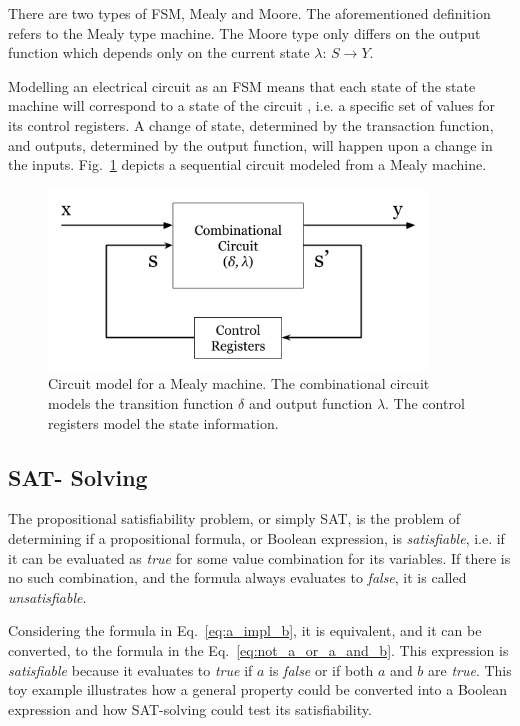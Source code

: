 There are two types of FSM, Mealy and Moore. The aforementioned definition refers to the Mealy type machine. The Moore type only differs on the output function which depends only on the current state $\lambda$: $S \to Y$.

Modelling an electrical circuit as an FSM means that each state of the state machine will correspond to a state of the circuit  , i.e. a specific set of values for its control registers. A change of state, determined by the transaction function, and outputs, determined by the output function, will happen upon a change in the inputs. Fig.~\ref{fig:mealy_circuit} depicts a sequential circuit modeled from a Mealy machine.

\begin{figure}[htb!]
	\centering
	\includegraphics[width=10cm]{images/mealy_circuit.png}
	\caption{Circuit model for a Mealy machine. The combinational circuit models the transition function $\delta$ and output function $\lambda$. The control registers model the state information.}
	\label{fig:mealy_circuit}
\end{figure}

\subsection*{SAT- Solving}

The propositional satisfiability problem, or simply SAT, is the problem of determining if a propositional formula, or Boolean expression, is \textit{satisfiable}, i.e. if it can be evaluated as \textit{true} for some value combination for its variables. If there is no such combination, and the formula always evaluates to \textit{false}, it is called \textit{unsatisfiable}. 


Considering the formula in Eq.~\ref{eq:a_impl_b}, it is equivalent, and it can be converted, to the formula in the Eq.~\ref{eq:not_a_or_a_and_b}. This expression is \textit{satisfiable} because it evaluates to \textit{true} if $a$ is \textit{false} or if both $a$ and $b$ are \textit{true}. This toy example illustrates how a general property could be converted into a Boolean expression and how SAT-solving could test its satisfiability.


